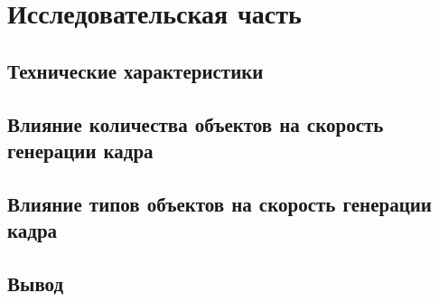 \section{Исследовательская часть}


\subsection{Технические характеристики}


\subsection{Влияние количества объектов на скорость генерации кадра}


\subsection{Влияние типов объектов на скорость генерации кадра}


\subsection*{Вывод}

